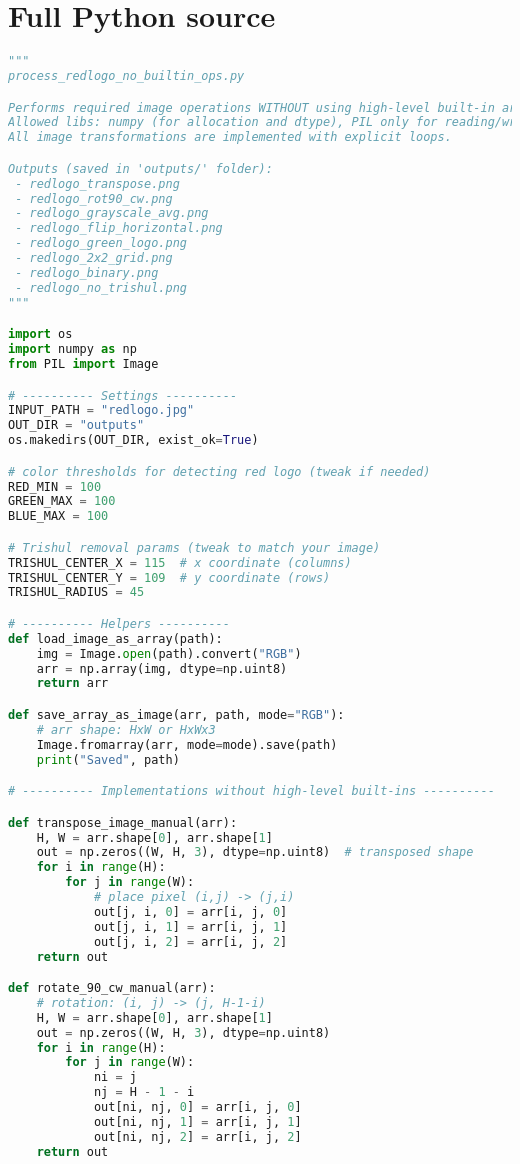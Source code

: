 \documentclass[11pt,a4paper]{article}
\begin{document}
\section{Full Python source}
\begin{lstlisting}[language=Python, caption=Manual 2x2 tile snippet]
"""
process_redlogo_no_builtin_ops.py

Performs required image operations WITHOUT using high-level built-in array ops.
Allowed libs: numpy (for allocation and dtype), PIL only for reading/writing images.
All image transformations are implemented with explicit loops.

Outputs (saved in 'outputs/' folder):
 - redlogo_transpose.png
 - redlogo_rot90_cw.png
 - redlogo_grayscale_avg.png
 - redlogo_flip_horizontal.png
 - redlogo_green_logo.png
 - redlogo_2x2_grid.png
 - redlogo_binary.png
 - redlogo_no_trishul.png
"""

import os
import numpy as np
from PIL import Image

# ---------- Settings ----------
INPUT_PATH = "redlogo.jpg"
OUT_DIR = "outputs"
os.makedirs(OUT_DIR, exist_ok=True)

# color thresholds for detecting red logo (tweak if needed)
RED_MIN = 100
GREEN_MAX = 100
BLUE_MAX = 100

# Trishul removal params (tweak to match your image)
TRISHUL_CENTER_X = 115  # x coordinate (columns)
TRISHUL_CENTER_Y = 109  # y coordinate (rows)
TRISHUL_RADIUS = 45

# ---------- Helpers ----------
def load_image_as_array(path):
    img = Image.open(path).convert("RGB")
    arr = np.array(img, dtype=np.uint8)
    return arr

def save_array_as_image(arr, path, mode="RGB"):
    # arr shape: HxW or HxWx3
    Image.fromarray(arr, mode=mode).save(path)
    print("Saved", path)

# ---------- Implementations without high-level built-ins ----------

def transpose_image_manual(arr):
    H, W = arr.shape[0], arr.shape[1]
    out = np.zeros((W, H, 3), dtype=np.uint8)  # transposed shape
    for i in range(H):
        for j in range(W):
            # place pixel (i,j) -> (j,i)
            out[j, i, 0] = arr[i, j, 0]
            out[j, i, 1] = arr[i, j, 1]
            out[j, i, 2] = arr[i, j, 2]
    return out

def rotate_90_cw_manual(arr):
    # rotation: (i, j) -> (j, H-1-i)
    H, W = arr.shape[0], arr.shape[1]
    out = np.zeros((W, H, 3), dtype=np.uint8)
    for i in range(H):
        for j in range(W):
            ni = j
            nj = H - 1 - i
            out[ni, nj, 0] = arr[i, j, 0]
            out[ni, nj, 1] = arr[i, j, 1]
            out[ni, nj, 2] = arr[i, j, 2]
    return out


\end{lstlisting}
\end{document}
